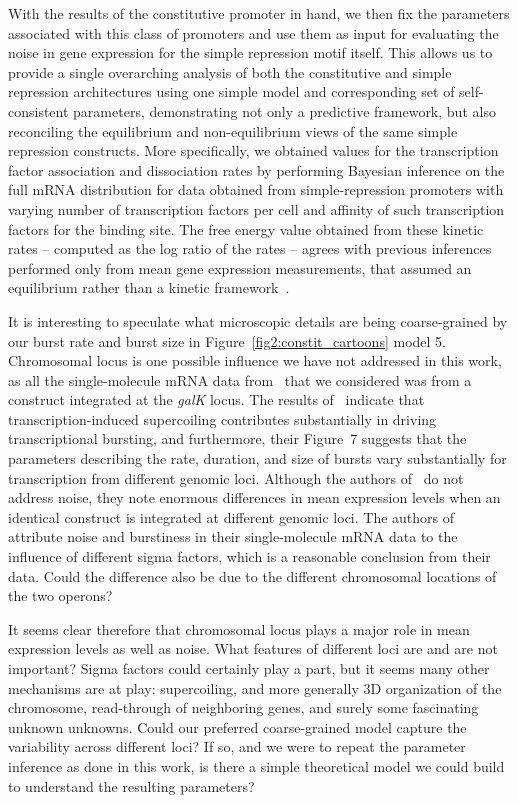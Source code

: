 With the results of the constitutive promoter in hand, we then fix the
parameters associated with this class of promoters and use them as input for
evaluating the noise in gene expression for the simple repression motif itself.
This allows us to provide a single overarching analysis of both the constitutive
and simple repression architectures using one simple model and corresponding set
of self-consistent parameters, demonstrating not only a predictive framework,
but also reconciling the equilibrium and non-equilibrium views of the same
simple repression constructs. More specifically, we obtained values for the
transcription factor association and dissociation rates by performing Bayesian
inference on the full mRNA distribution for data obtained from simple-repression
promoters with varying number of transcription factors per cell and affinity of
such transcription factors for the binding site. The free energy value obtained
from these kinetic rates -- computed as the log ratio of the rates -- agrees
with previous inferences performed only from mean gene expression measurements,
that assumed an equilibrium rather than a kinetic
framework~\cite{Garcia2011a, Razo-Mejia2018}.

It is interesting to speculate what microscopic details are being coarse-grained
by our burst rate and burst size in Figure~\ref{fig2:constit_cartoons} model 5.
Chromosomal locus is one possible influence we have not addressed in this work,
as all the single-molecule mRNA data from~\cite{Jones2014} that we considered
was from a construct integrated at the \textit{galK} locus. The results
of~\cite{Chong2014} indicate that transcription-induced supercoiling contributes
substantially in driving transcriptional bursting, and furthermore, their
Figure~7 suggests that the parameters describing the rate, duration, and size of
bursts vary substantially for transcription from different genomic loci.
Although the authors of~\cite{Englaender2017} do not address noise, they note
enormous differences in mean expression levels when an identical construct is
integrated at different genomic loci. The authors of~\cite{Engl2020} attribute
noise and burstiness in their single-molecule mRNA data to the influence of
different sigma factors, which is a reasonable conclusion from their data. Could
the difference also be due to the different chromosomal locations of the two
operons?

It seems clear therefore that chromosomal locus plays a major role in mean
expression levels as well as noise. What features of different loci are and are
not important? Sigma factors could certainly play a part, but it seems many
other mechanisms are at play: supercoiling, and more generally 3D organization
of the chromosome, read-through of neighboring genes, and surely some
fascinating unknown unknowns. Could our preferred coarse-grained model capture
the variability across different loci? If so, and we were to repeat the
parameter inference as done in this work, is there a simple theoretical model we
could build to understand the resulting parameters?

